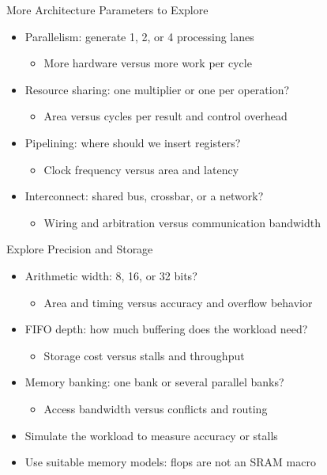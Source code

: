 \begin{frame}{More Architecture Parameters to Explore}
\begin{itemize}
\item Parallelism: generate 1, 2, or 4 processing lanes
\begin{itemize}
\item More hardware versus more work per cycle
\end{itemize}
\item Resource sharing: one multiplier or one per operation?
\begin{itemize}
\item Area versus cycles per result and control overhead
\end{itemize}
\item Pipelining: where should we insert registers?
\begin{itemize}
\item Clock frequency versus area and latency
\end{itemize}
\item Interconnect: shared bus, crossbar, or a network?
\begin{itemize}
\item Wiring and arbitration versus communication bandwidth
\end{itemize}
\end{itemize}
\end{frame}

\begin{frame}{Explore Precision and Storage}
\begin{itemize}
\item Arithmetic width: 8, 16, or 32 bits?
\begin{itemize}
\item Area and timing versus accuracy and overflow behavior
\end{itemize}
\item FIFO depth: how much buffering does the workload need?
\begin{itemize}
\item Storage cost versus stalls and throughput
\end{itemize}
\item Memory banking: one bank or several parallel banks?
\begin{itemize}
\item Access bandwidth versus conflicts and routing
\end{itemize}
\item Simulate the workload to measure accuracy or stalls
\item Use suitable memory models: flops are not an SRAM macro
\end{itemize}
\end{frame}


